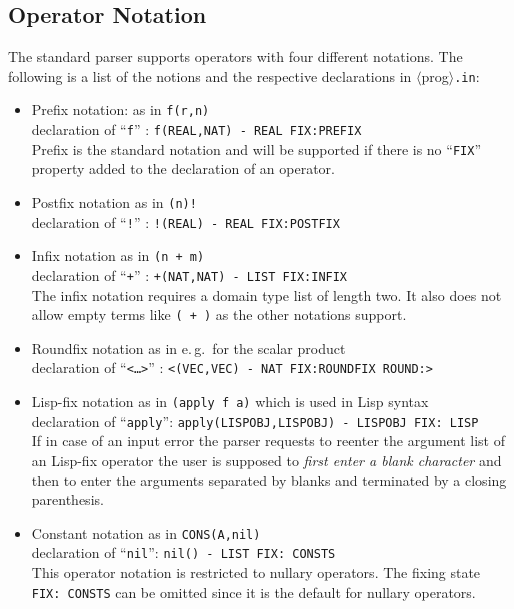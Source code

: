 \subsection{Operator Notation}
\label{OperatorNotation}
The standard parser supports operators with four different notations.
The following is a list of the notions and the respective declarations in
$\langle$prog$\rangle${\tt .in}:
\begin{itemize}
\item
Prefix notation: as in {\tt f(r,n)} \\
declaration of ``{\tt f}'' : {\tt f(REAL,NAT) - REAL FIX:PREFIX}\\
Prefix is the standard notation and will be supported if there is no 
``{\tt FIX}'' property added to the declaration of an operator.
\item 
Postfix notation as in {\tt (n)!} \\
declaration of ``{\tt !}'' : {\tt !(REAL) - REAL FIX:POSTFIX}
\item 
Infix notation as in {\tt (n + m)} \\
declaration of ``{\tt +}'' : {\tt +(NAT,NAT) - LIST FIX:INFIX} \\
The infix notation requires a domain type list of length two.
It also does not allow empty terms like {\tt ( + )} as the other notations
support. 
\item
Roundfix notation as in {\tt < v1,v2 >} e.\,g.\  for the scalar product\\
declaration of ``{\tt <\ldots >}'' : 
{\tt <(VEC,VEC) - NAT FIX:ROUNDFIX ROUND:>}
\item Lisp-fix notation as in {\tt (apply f a)} which is used in Lisp syntax\\
declaration of ``{\tt apply}'': 
{\tt apply(LISPOBJ,LISPOBJ) - LISPOBJ FIX: LISP} \\
If in case of an input error the parser requests to reenter the argument list
of an Lisp-fix operator the user is supposed to {\em first enter a blank
character} and then to enter the arguments separated by blanks and 
terminated by a closing parenthesis.

\item Constant notation as in {\tt CONS(A,nil)}\\
declaration of ``{\tt nil}'': {\tt nil() - LIST FIX: CONSTS}\\ 
This operator notation is restricted to nullary operators.
The fixing state {\tt FIX: CONSTS} can be omitted since it is the
default for nullary operators.
\end{itemize}

